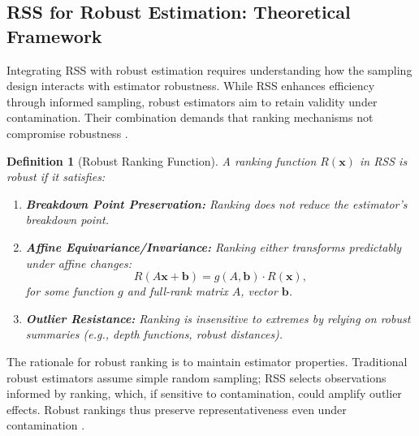 \documentclass[12pt]{article}
\newtheorem{definition}{Definition}[section] %
\begin{document}
\subsection{RSS for Robust Estimation: Theoretical Framework}

Integrating RSS with robust estimation requires understanding how the sampling design interacts with estimator robustness. While RSS enhances efficiency through informed sampling, robust estimators aim to retain validity under contamination. Their combination demands that ranking mechanisms not compromise robustness \cite{ChenStasnyWolfe2006}.

\begin{definition}[Robust Ranking Function]
A ranking function $R(\mathbf{x})$ in RSS is \emph{robust} if it satisfies:
\begin{enumerate}
    \item \textbf{Breakdown Point Preservation:} Ranking does not reduce the estimator’s breakdown point.
    \item \textbf{Affine Equivariance/Invariance:} Ranking either transforms predictably under affine changes:
    \[
    R(A\mathbf{x} + \mathbf{b}) = g(A, \mathbf{b}) \cdot R(\mathbf{x}),
    \]
    for some function $g$ and full-rank matrix $A$, vector $\mathbf{b}$.
    \item \textbf{Outlier Resistance:} Ranking is insensitive to extremes by relying on robust summaries (e.g., depth functions, robust distances).
\end{enumerate}
\end{definition}

The rationale for robust ranking is to maintain estimator properties. Traditional robust estimators assume simple random sampling; RSS selects observations informed by ranking, which, if sensitive to contamination, could amplify outlier effects. Robust rankings thus preserve representativeness even under contamination \cite{Hubert2012}.
\end{document}
